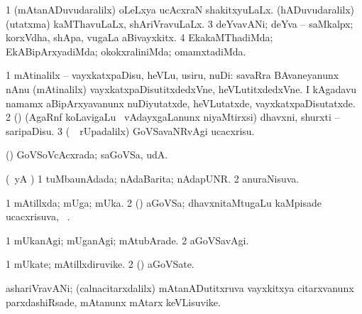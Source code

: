 {{{{{{{{{{{{\noindent 
\gl{\pagu}
\expl{}
\bmng
\bnum
\num{1}  
  
\banum
{} (mAtanADuvudaralilx) oLeLxya ucAcxraN shakitxyuLaLx. 
 (hADuvudaralilx) (utatxma) kaMThavuLaLx, shAriVravuLaLx. 
\eanum
\numie
\num{3}  deYvavANi; deYva -- saMkalpx; korxVdha, shApa, \mo vugaLa aBivayxkitx. 
\num{4}  EkakaMThadiMda; EkABipArxyadiMda; okokxraliniMda; omamxtadiMda. 
\enum
\emng
\eentry

\bentry
{} 
\gl{\sakirx}
\expl{}
\bmng
\bnum
\num{1} mAtinalilx -- vayxkatxpaDisu, heVLu, usiru, nuDi:  savaRra BAvaneyanunx nAnu (mAtinalilx) vayxkatxpaDisutitxdedxVne, heVLutitxdedxVne.  I kAgadavu namamx aBipArxyavanunx nuDiyutatxde, heVLutatxde, vayxkatxpaDisutatxde. 
\num{2} (\saM) (AgaRnf koLavigaLu \mo\ vAdayxgaLanunx niyaMtirxsi) dhavxni, shurxti -- saripaDisu. 
\num{3} (\kanmu\ \BUkaq\ rUpadalilx) GoVSavaNRvAgi ucacxrisu. 
\enum
\emng
\eentry

\bentry 
{} 
\gl{\nA}
\expl{}
\bmng
\emng
\eentry

\bentry
{} 
\gl{\gu}
\expl{}
\bmng
 (\dhavxni) GoVSoVcAcxrada; saGoVSa, udA.  
\emng
\eentry

\bentry 
{} 
\gl{\gu}
\expl{}
\bmng
 (\kAparx\ yA \alaMshA) 
\bnum
\num{1} tuMbaunAdada; nAdaBarita; nAdapUNR. 
\num{2} anuraNisuva. 
\enum
\emng
\eentry

\bentry 
{} 
\gl{\gu}
\expl{}
\bmng
\bnum
\num{1} mAtillxda; mUga; mUka. 
\num{2} (\dhavxni) aGoVSa; dhavxnitaMtugaLu kaMpisade ucacxrisuva, \udA\ . 
\enum
\emng
\eentry

\bentry
{} 
\gl{\kirxvi}
\expl{}
\bmng
\bnum
\num{1} mUkanAgi; mUganAgi; mAtubArade. 
\num{2} aGoVSavAgi. 
\enum
\emng
\eentry

\bentry
{} 
\gl{\nA}
\expl{}
\bmng
\bnum
\num{1} mUkate; mAtillxdiruvike. 
\num{2} (\dhavxni) aGoVSate. 
\enum
\emng
\eentry

\bentry
{} 
\gl{\nA}
\expl{}
\bmng
 ashariVravANi; (calnacitarxdalilx) mAtanADutitxruva vayxkitxya citarxvanunx parxdashiRsade, mAtanunx mAtarx keVLisuvike. 
\emng
\eentry

}}}}}}}}}}}}
